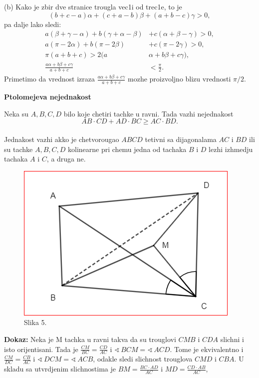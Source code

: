 \documentclass[11pt]{article}
\def\ug{\mathbin{\sphericalangle\,}}
\newcommand{\D}{\displaystyle}
\begin{document}
\vspace{0.5cm}

(b) Kako je zbir dve stranice trougla vec1i od trec1e, to je $$(b+c-a)\alpha+(c+a-b)\beta+(a+b-c)\gamma>0,$$ pa dalje lako sledi:
\begin{equation*}
\begin{aligned}
a(\beta+\gamma-\alpha)+b(\gamma+\alpha-\beta)&+c(\alpha+\beta-\gamma)>0,\\
a(\pi-2\alpha)+b(\pi-2\beta)&+c(\pi-2\gamma)>0,\\
\pi(a+b+c)>2(a&\alpha+b\beta+c\gamma),\\
\D\frac{a\alpha+b\beta+c\gamma}{a+b+c}&<\frac{\pi}{2}.
\end{aligned}    
\end{equation*}
Primetimo da vrednost izraza $\D\frac{a\alpha+b\beta+c\gamma}{a+b+c}$ mozhe proizvoljno blizu vrednosti $\pi/2.$\\

\newpage
\large
\vspace*{-1in}
\begin{flushleft}
\begin{center}
    \huge
    \textbf{Ptolomejeva nejednakost}
\end{center}
\vspace*{0.4in}
Neka su $A,B,C,D$ bilo koje chetiri tachke u ravni. Tada vazhi nejednakost $$AB\cdot CD+AD\cdot BC \geq AC\cdot BD.$$\\
Jednakost vazhi akko je chetvorougao $ABCD$ tetivni sa dijagonalama $AC$ i $BD$ ili su tachke $A,B,C,D$ kolinearne pri chemu jedna od tachaka $B$ i $D$ lezhi izhmedju tachaka $A$ i $C$, a druga ne.\\
\end{flushleft}
\par
\begin{figure} %
    \centering
    \includegraphics[scale=0.53]{Slike/Slika5}
    \caption*{Slika 5.}
\end{figure}
\textbf{Dokaz:} Neka je M tachka u ravni takva da su trouglovi $CMB$ i $CDA$ slichni i isto \text orijentisani. Tada je $\D\frac{CM}{BC}=\frac{CD}{AC}$ i $\D\ug BCM=\ug ACD.$ Tome je \text ekvivalentno i $\D\frac{CM}{DC}=\frac{CB}{AC}$ i $\ug DCM=\ug ACB$, odakle sledi slichnost trouglova $CMD$ i $CBA$. U skladu sa utvrdjenim slichnostima je $\D BM=\frac{BC\cdot AD}{AC}$ i $\D MD=\frac{CD\cdot AB}{AC}$,\\
\end{document}
